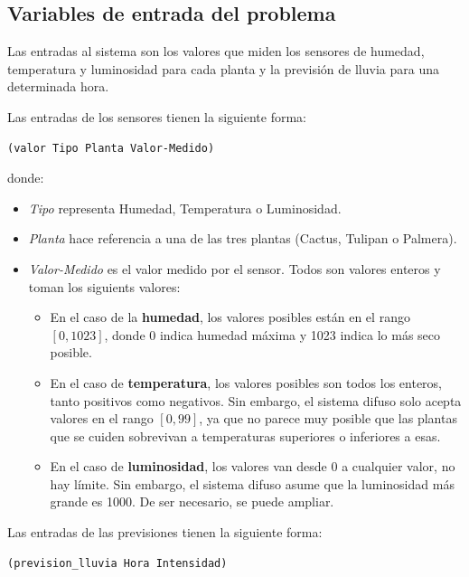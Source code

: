 \documentclass[11pt,a4paper]{article}
\begin{document}
\subsection{Variables de entrada del problema}
\label{subsect:input}

Las entradas al sistema son los valores que miden los sensores de humedad, temperatura y luminosidad para cada planta y la previsión
de lluvia para una determinada hora.

Las entradas de los sensores tienen la siguiente forma:

\begin{lstlisting}
(valor Tipo Planta Valor-Medido)
\end{lstlisting}

\noindent donde:

\begin{itemize}
	\item \textit{Tipo} representa Humedad, Temperatura o Luminosidad.
	\item \textit{Planta} hace referencia a una de las tres plantas (Cactus, Tulipan o Palmera).
	\item \textit{Valor-Medido} es el valor medido por el sensor. Todos son valores enteros y toman los siguients valores:
	
	\begin{itemize}
		\item En el caso de la \textbf{humedad}, los valores posibles están en el rango $[0, 1023]$, donde 0 indica humedad máxima
		y 1023 indica lo más seco posible.
		\item En el caso de \textbf{temperatura}, los valores posibles son todos los enteros, tanto positivos como negativos.
		Sin embargo, el sistema difuso solo acepta valores en el rango $[0, 99]$, ya que no parece muy posible que las plantas
		que se cuiden sobrevivan a temperaturas superiores o inferiores a esas.
		\item En el caso de \textbf{luminosidad}, los valores van desde 0 a cualquier valor, no hay límite. Sin embargo, el
		sistema difuso asume que la luminosidad más grande es 1000. De ser necesario, se puede ampliar.
	\end{itemize}
\end{itemize}

Las entradas de las previsiones tienen la siguiente forma:

\begin{lstlisting}
(prevision_lluvia Hora Intensidad)
\end{lstlisting}
\end{document}

